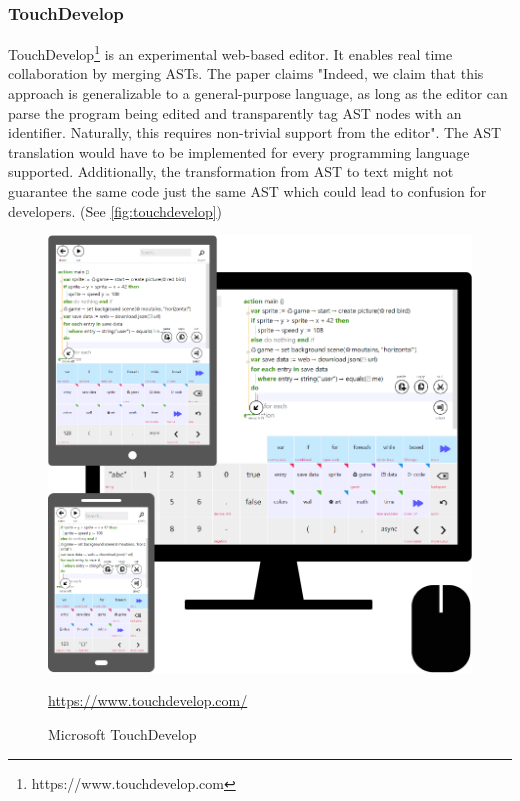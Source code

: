 \subsubsection{TouchDevelop}
TouchDevelop\footnote{https://www.touchdevelop.com} is an experimental web-based editor. It enables real time collaboration by merging ASTs. The paper claims "Indeed, we claim that this approach is generalizable to a
general-purpose language, as long as the editor can parse the
program being edited and transparently tag AST nodes with
an identifier. Naturally, this requires non-trivial support from
the editor". \cite{ProtzenkoBurckhardtMoskalMcClurg:2015:Implementingreal-timecollaborationinTouchDevelopusingASTmerges} The AST translation would have to be implemented for every programming language supported. Additionally, the transformation from AST to text might not guarantee the same code just the same AST which could lead to confusion for developers. (See \autoref{fig:touchdevelop})
\begin{figure}[hb]
    \centering
    \includegraphics{figures/screenshots/touchdevelop.png}
	\caption{Microsoft TouchDevelop }
	\href{https://www.touchdevelop.com/}{https://www.touchdevelop.com/}
    \label{fig:touchdevelop}
\end{figure}
